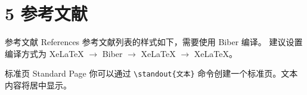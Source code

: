 \documentclass[10pt,aspectratio=169,fontset=none]{ctexbeamer}
\begin{document}
    \section{5 参考文献}

    \begin{frame}{参考文献 References}
        参考文献列表的样式如下，需要使用 Biber 编译。 建议设置编译方式为 XeLaTeX $\to$ Biber $\to$ XeLaTeX $\to$ XeLaTeX。
        \vspace*{1em}
         
        
    \end{frame}

    \begin{frame}{标准页 Standard Page}
        你可以通过 \texttt{\textcolor{primary}{\textbackslash standout}\{文本\}} 命令创建一个标准页。文本内容将居中显示。
    \end{frame}

\end{document}
